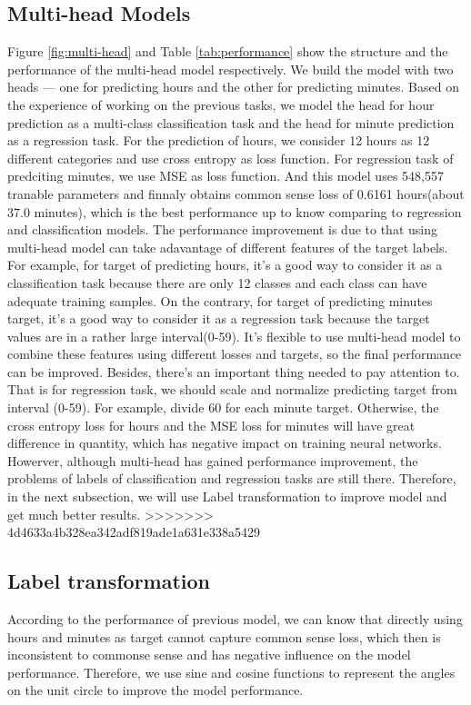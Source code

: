 \documentclass{article}
\begin{document}
\subsection{Multi-head Models}
Figure \ref{fig:multi-head} and Table \ref{tab:performance} show the structure and the performance of the multi-head model respectively. We build the model with two heads --- one for predicting hours and the other for predicting minutes. Based on the experience of working on the previous tasks, we model the head for hour prediction as a multi-class classification task and the head for minute prediction as a regression task. For the prediction of hours, we consider 12 hours as 12 different categories and use cross entropy as loss function. For regression task of predciting minutes, we use MSE as loss function. And this model uses 548,557 tranable parameters and finnaly obtains common sense loss of 0.6161 hours(about 37.0 minutes), which is the best performance up to know comparing to regression and classification models. The performance improvement is due to that using multi-head model can take adavantage of different features of the target labels. For example, for target of predicting hours, it's a good way to consider it as a classification task because there are only 12 classes and each class can have adequate training samples. On the contrary, for target of predicting minutes target, it's a good way to consider it as a regression task because the target values are in a rather large interval(0-59). It's flexible to use multi-head model to combine these features using different losses and targets, so the final performance can be improved. Besides, there's an important thing needed to pay attention to. That is for regression task, we should scale and normalize predicting target from interval (0-59). For example, divide 60 for each minute target. Otherwise, the cross entropy loss for hours and the MSE loss for minutes will have great difference in quantity, which has negative impact on training neural networks. Howerver, although multi-head has gained performance improvement, the problems of labels of classification and regression tasks are still there. Therefore, in the next subsection, we will use Label transformation to improve model and get much better results.
>>>>>>> 4d4633a4b328ea342adf819ade1a631e338a5429


\subsection{Label transformation}
According to the performance of previous model, we can know that directly using hours and minutes as target cannot capture common sense loss, which then is inconsistent to commonse sense and has negative influence on the model performance. Therefore, we use sine and cosine functions to represent the angles on the unit circle to improve the model performance.
\end{document}
